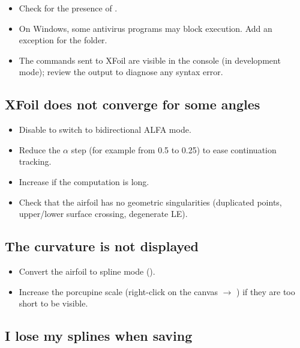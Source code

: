 \begin{itemize}
    \item Check for the presence of .
    \item On Windows, some antivirus programs may block
        execution. Add an exception for the
         folder.
    \item The commands sent to XFoil are visible in the
        console (in development mode); review the output
        to diagnose any syntax error.
\end{itemize}

\subsection*{XFoil does not converge for some angles}

\begin{itemize}
    \item Disable  to switch to bidirectional ALFA
        mode.
    \item Reduce the $\alpha$ step (for example from 0.5\textdegree{} to
        0.25\textdegree{}) to ease continuation tracking.
    \item Increase  if the computation is long.
    \item Check that the airfoil has no geometric
        singularities (duplicated points, upper/lower surface crossing,
        degenerate LE).
\end{itemize}

\subsection*{The curvature is not displayed}

\begin{itemize}
    \item Convert the airfoil to spline mode
        ().
    \item Increase the porcupine scale (right-click on the
        canvas $\rightarrow$ ) if
        they are too short to be visible.
\end{itemize}

\subsection*{I lose my splines when saving}

